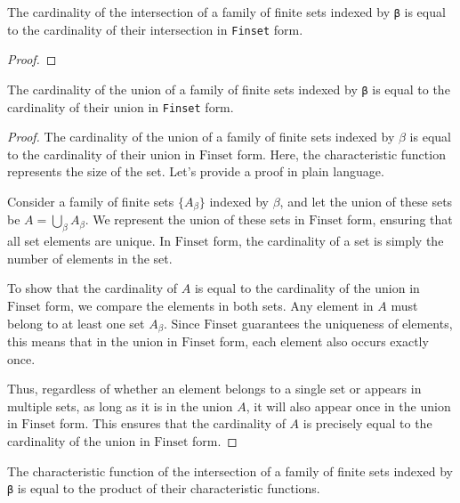 \begin{lemma}\label{card_eq_FinInter}
  \leanok
  The cardinality of the intersection of a family of finite sets indexed by \verb|β| is equal to the cardinality of their intersection in \verb|Finset| form.
\end{lemma}

\begin{proof}
  \leanok
\end{proof}


\begin{lemma}\label{card_eq_FinUnion}
  \leanok
  The cardinality of the union of a family of finite sets indexed by \verb|β| is equal to the cardinality of their union in \verb|Finset| form.
\end{lemma}


\begin{proof}
    \leanok
The cardinality of the union of a family of finite sets indexed by \(\beta\) is equal to the cardinality of their union in \(\text{Finset}\) form. Here, the characteristic function represents the size of the set. Let's provide a proof in plain language.

Consider a family of finite sets \(\{A_\beta\}\) indexed by \(\beta\), and let the union of these sets be \(A = \bigcup_\beta A_\beta\). We represent the union of these sets in \(\text{Finset}\) form, ensuring that all set elements are unique. In \(\text{Finset}\) form, the cardinality of a set is simply the number of elements in the set.

To show that the cardinality of \(A\) is equal to the cardinality of the union in \(\text{Finset}\) form, we compare the elements in both sets. Any element in \(A\) must belong to at least one set \(A_\beta\). Since \(\text{Finset}\) guarantees the uniqueness of elements, this means that in the union in \(\text{Finset}\) form, each element also occurs exactly once.

Thus, regardless of whether an element belongs to a single set or appears in multiple sets, as long as it is in the union \(A\), it will also appear once in the union in \(\text{Finset}\) form. This ensures that the cardinality of \(A\) is precisely equal to the cardinality of the union in \(\text{Finset}\) form.

\end{proof}

\begin{lemma}\label{char_fun_FinInter}
  \leanok
  The characteristic function of the intersection of a family of finite sets indexed by \verb|β| is equal to the product of their characteristic functions.
\end{lemma}

